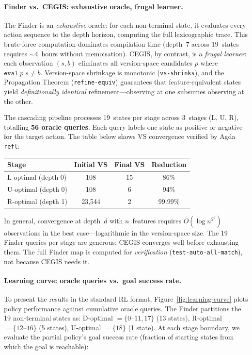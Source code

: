 \paragraph{Finder vs.\ CEGIS: exhaustive oracle, frugal learner.}
The Finder is an \emph{exhaustive} oracle: for each non-terminal state, it evaluates every action sequence to the depth horizon, computing the full lexicographic trace.  This brute-force computation dominates compilation time (depth~7 across 19~states requires $\sim$4~hours without memoisation).  CEGIS, by contrast, is a \emph{frugal learner}: each observation $(s, b)$ eliminates all version-space candidates $p$ where $\texttt{eval}\;p\;s \neq b$.  Version-space shrinkage is monotonic (\texttt{vs-shrinks}), and the Propagation Theorem (\texttt{refine-equiv}) guarantees that feature-equivalent states yield \emph{definitionally identical} refinement---observing at one subsumes observing at the other.

The cascading pipeline processes 19~states per stage across 3~stages (L, U, R), totalling \textbf{56 oracle queries}.  Each query labels one state as positive or negative for the target action.  The table below shows VS convergence verified by Agda \texttt{refl}:

\begin{center}
\small
\begin{tabular}{@{}lccc@{}}
\textbf{Stage} & \textbf{Initial VS} & \textbf{Final VS} & \textbf{Reduction} \\
\hline
L-optimal (depth 0) & 108 & 15 & 86\% \\
U-optimal (depth 0) & 108 & 6 & 94\% \\
R-optimal (depth 1) & 23{,}544 & 2 & 99.99\% \\
\end{tabular}
\end{center}

\noindent In general, convergence at depth~$d$ with $n$~features requires $O(\log n^{2^d})$ observations in the best case---logarithmic in the version-space size.  The 19 Finder queries per stage are generous; CEGIS converges well before exhausting them.  The full Finder map is computed for \emph{verification} (\texttt{test-auto-all-match}), not because CEGIS needs it.


\paragraph{Learning curve: oracle queries vs.\ goal success rate.}
To present the results in the standard RL format, Figure~\ref{fig:learning-curve} plots policy performance against cumulative oracle queries.  The Finder partitions the 19 non-terminal states as: D-optimal $= \{0\text{--}11, 17\}$ (13 states), R-optimal $= \{12\text{--}16\}$ (5 states), U-optimal $= \{18\}$ (1 state).  At each stage boundary, we evaluate the partial policy's goal success rate (fraction of starting states from which the goal is reachable):

